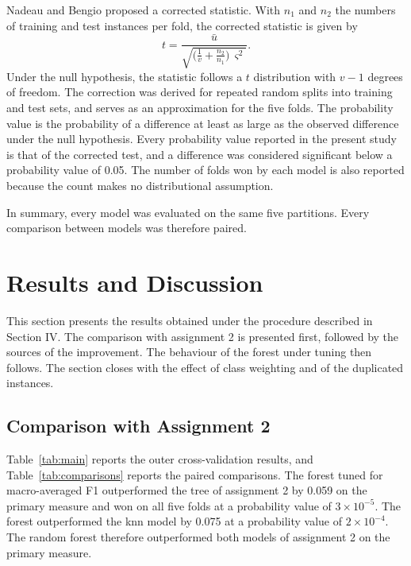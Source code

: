 \documentclass[conference]{IEEEtran}
\begin{document}
Nadeau and Bengio proposed a corrected statistic. With $n_1$ and $n_2$ the numbers
of training and test instances per fold, the corrected statistic is given by
\begin{equation}
t = \frac{\bar{u}}{\sqrt{\big(\frac{1}{v} + \frac{n_2}{n_1}\big)\,\varsigma^2}} .
\end{equation}
Under the null hypothesis, the statistic follows a $t$ distribution with $v - 1$
degrees of freedom. The correction was derived for repeated random splits into
training and test sets, and serves as an approximation for the five folds. The probability value is the probability of a difference at
least as large as the observed difference under the null hypothesis. Every
probability value reported in the present study is that of the corrected test, and
a difference was considered significant below a probability value of 0.05. The
number of folds won by each model is also reported because the count makes no
distributional assumption.

In summary, every model was evaluated on the same five partitions. Every comparison
between models was therefore paired.

\section{Results and Discussion}

This section presents the results obtained under the procedure described in
Section IV. The comparison with assignment 2 is presented first, followed by the
sources of the improvement. The behaviour of the forest under tuning then follows.
The section closes with the effect of class weighting and of the duplicated
instances.

\subsection{Comparison with Assignment 2}

Table~\ref{tab:main} reports the outer cross-validation results, and
Table~\ref{tab:comparisons} reports the paired comparisons. The forest tuned for
macro-averaged F1 outperformed the tree of assignment 2 by 0.059 on the primary
measure and won on all five folds at a probability value of $3 \times 10^{-5}$. The
forest outperformed the \gls{knn} model by 0.075 at a probability value of
$2 \times 10^{-4}$. The random forest therefore outperformed both models of
assignment 2 on the primary measure.
\end{document}
